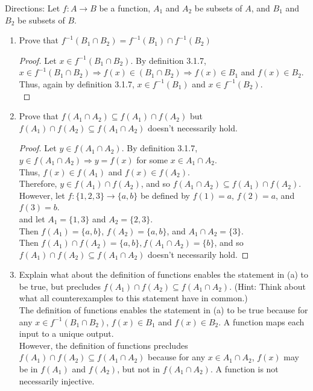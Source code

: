 \documentclass{article}
\begin{document}
Directions: Let $f:A\to B$ be a function, $A_1$ and $A_2$ be subsets of $A$, and $B_1$ and $B_2$ be subsets of $B$.

\begin{enumerate}
    \item Prove that $f^{-1}(B_1\cap B_2)=f^{-1}(B_1)\cap f^{-1}(B_2)$
    \begin{proof}
        Let $x\in f^{-1}(B_1\cap B_2)$. 
        By definition 3.1.7, $x\in f^{-1}(B_1\cap B_2)\Rightarrow f(x)\in(B_1\cap B_2)\Rightarrow f(x)\in B_1$ and $f(x)\in B_2$.\\
        Thus, again by definition 3.1.7, $x\in f^{-1}(B_1)$ and $x\in f^{-1}(B_2)$.\\
    \end{proof}
    \item Prove that $f(A_1\cap A_2)\subseteq f(A_1)\cap f(A_2)$ but $f(A_1)\cap f(A_2)\subseteq f(A_1\cap A_2)$ doesn't necessarily hold.
    \begin{proof}
        Let $y\in f(A_1\cap A_2)$. By definition 3.1.7, $y\in f(A_1\cap A_2)\Rightarrow y=f(x)$ for some $x\in A_1\cap A_2$.\\
        Thus, $f(x)\in f(A_1)$ and $f(x)\in f(A_2)$.\\
        Therefore, $y\in f(A_1)\cap f(A_2)$, and so $f(A_1\cap A_2)\subseteq f(A_1)\cap f(A_2)$.\\
        However, let $f:\{1,2,3\}\to\{a,b\}$ be defined by $f(1)=a$, $f(2)=a$, and $f(3)=b$.\\
        and let $A_1=\{1,3\}$ and $A_2=\{2,3\}$.\\
        Then $f(A_1)=\{a,b\}$, $f(A_2)=\{a,b\}$, and $A_1\cap A_2=\{3\}$.\\
        Then $f(A_1)\cap f(A_2)=\{a,b\}, f(A_1\cap A_2)=\{b\}$, and so $f(A_1)\cap f(A_2)\subseteq f(A_1\cap A_2)$ doesn't necessarily hold.
    \end{proof}
    \item Explain what about the definition of functions enables the statement in (a) to be true, but precludes $f(A_1)\cap f(A_2)\subseteq f(A_1\cap A_2)$. (Hint: Think about what all counterexamples to this statement have in common.)\\
        The definition of functions enables the statement in (a) to be true 
        because for any $x\in f^{-1}(B_1\cap B_2)$, $f(x)\in B_1$ and $f(x)\in B_2$. A function maps each input to a unique output.\\
        However, the definition of functions precludes $f(A_1)\cap f(A_2)\subseteq f(A_1\cap A_2)$ 
        because for any $x\in A_1\cap A_2$, $f(x)$ may be in $f(A_1)$ and $f(A_2)$, but not in $f(A_1\cap A_2)$. A function is not necessarily injective.
\end{enumerate}
\end{document}
